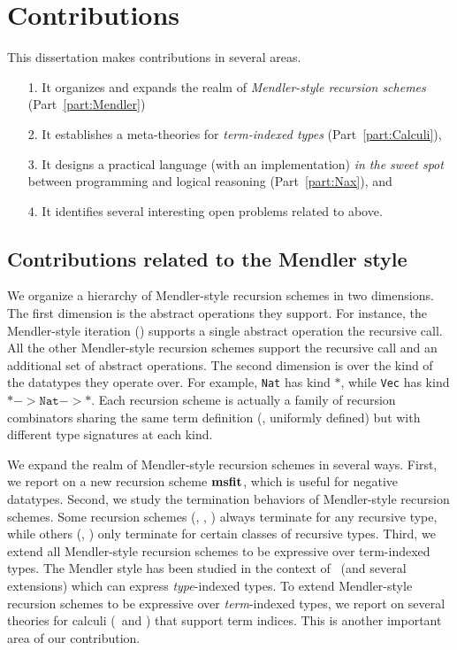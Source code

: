 \section{Contributions}\label{sec:intro:contrib}
This dissertation makes contributions in several areas.
\begin{itemize}
\item[1.]
    It organizes and expands the realm of \emph{Mendler-style recursion schemes}
    (Part~\ref{part:Mendler})

\item[2.] It establishes a meta-theories for \emph{term-indexed types}
        (Part~\ref{part:Calculi}),

\item[3.] It designs a practical language (with an implementation)
        \emph{in the sweet spot} between programming and logical reasoning
        (Part~\ref{part:Nax}), and

\item[4.] It identifies several interesting open problems related to above.
\end{itemize}

\subsection{Contributions related to the Mendler style}
We organize a hierarchy of Mendler-style recursion schemes in two dimensions.
The first dimension is the abstract operations they support. For instance,
the Mendler-style iteration (\MIt) supports a single abstract operation
the recursive call. All the other Mendler-style recursion schemes
support the recursive call and an additional set of abstract operations. 
The second dimension is over the kind of the datatypes they operate over.
For example, \texttt{Nat} has kind $*$, while \texttt{Vec}
has kind $* -> \mathtt{Nat} -> *$. Each recursion scheme is actually a
family of recursion combinators sharing the same term definition
(\ie, uniformly defined) but with different type signatures at each kind.

We expand the realm of Mendler-style recursion schemes in several ways.
First, we report on a new recursion scheme $\mathbf{msfit}$, which is useful
for negative datatypes.  Second, we study the termination behaviors
of Mendler-style recursion schemes. Some recursion schemes (\eg, \MIt, \MsfIt)
always terminate for any recursive type, while others (\eg, \McvPr) only
terminate for certain classes of recursive types. Third, we extend
all Mendler-style recursion schemes to be expressive over term-indexed types.
The Mendler style has been studied in the context of \Fw\ (and several
extensions) which can express \emph{type}-indexed types. To extend Mendler-style
recursion schemes to be expressive over \emph{term}-indexed types, we report on
several theories for calculi (\Fi\ and \Fixi) that support term indices.
This is another important area of our contribution.

